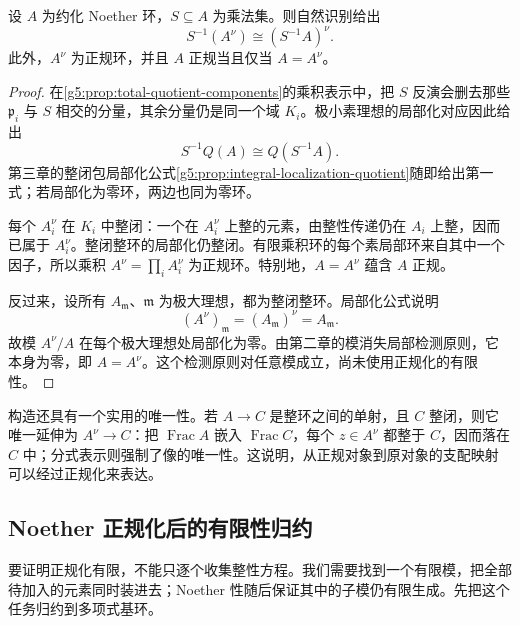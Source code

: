 \begin{proposition}\label{g5:prop:normalization-localization}
	设 \(A\) 为约化 Noether 环，\(S\subseteq A\) 为乘法集。则自然识别给出
	\[
		S^{-1}(A^\nu)\cong(S^{-1}A)^\nu.
	\]
	此外，\(A^\nu\) 为正规环，并且 \(A\) 正规当且仅当 \(A=A^\nu\)。
\end{proposition}
\begin{proof}
	在\cref{g5:prop:total-quotient-components}的乘积表示中，把 \(S\) 反演会删去那些 \(\mathfrak p_i\) 与 \(S\) 相交的分量，其余分量仍是同一个域 \(K_i\)。极小素理想的局部化对应因此给出
	\[
		S^{-1}Q(A)\cong Q(S^{-1}A).
	\]
	第三章的整闭包局部化公式\cref{g5:prop:integral-localization-quotient}随即给出第一式；若局部化为零环，两边也同为零环。

	每个 \(A_i^\nu\) 在 \(K_i\) 中整闭：一个在 \(A_i^\nu\) 上整的元素，由整性传递仍在 \(A_i\) 上整，因而已属于 \(A_i^\nu\)。整闭整环的局部化仍整闭。有限乘积环的每个素局部环来自其中一个因子，所以乘积 \(A^\nu=\prod_i A_i^\nu\) 为正规环。特别地，\(A=A^\nu\) 蕴含 \(A\) 正规。

	反过来，设所有 \(A_{\mathfrak m}\)、\(\mathfrak m\) 为极大理想，都为整闭整环。局部化公式说明
	\[
		(A^\nu)_{\mathfrak m}=(A_{\mathfrak m})^\nu=A_{\mathfrak m}.
	\]
	故模 \(A^\nu/A\) 在每个极大理想处局部化为零。由第二章的模消失局部检测原则，它本身为零，即 \(A=A^\nu\)。这个检测原则对任意模成立，尚未使用正规化的有限性。
\end{proof}

构造还具有一个实用的唯一性。若 \(A\to C\) 是整环之间的单射，且 \(C\) 整闭，则它唯一延伸为 \(A^\nu\to C\)：把 \(\operatorname{Frac}A\) 嵌入 \(\operatorname{Frac}C\)，每个 \(z\in A^\nu\) 都整于 \(C\)，因而落在 \(C\) 中；分式表示则强制了像的唯一性。这说明，从正规对象到原对象的支配映射可以经过正规化来表达。

\subsection{Noether 正规化后的有限性归约}
\label{g5:subsec:0402:02}

要证明正规化有限，不能只逐个收集整性方程。我们需要找到一个有限模，把全部待加入的元素同时装进去；Noether 性随后保证其中的子模仍有限生成。先把这个任务归约到多项式基环。

